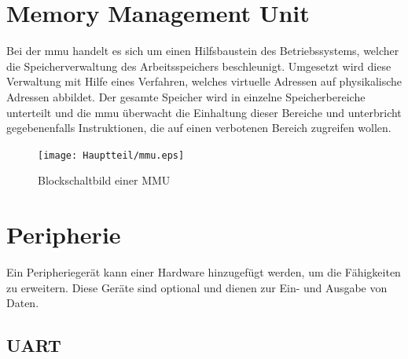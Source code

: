 \section{Memory Management Unit}\label{kap:mmu}

Bei der \ac{mmu} handelt es sich um einen Hilfsbaustein des Betriebssystems, welcher die Speicherverwaltung des Arbeitsspeichers beschleunigt. Umgesetzt wird diese Verwaltung mit
Hilfe eines Verfahren, welches virtuelle Adressen auf physikalische Adressen abbildet. Der gesamte Speicher wird in einzelne Speicherbereiche unterteilt und die
\ac{mmu} überwacht die Einhaltung dieser Bereiche und unterbricht gegebenenfalls Instruktionen, die auf einen verbotenen
Bereich zugreifen wollen.\cite{itwissen}\\

\begin{figure}[H]
\centering
\texttt{[image: Hauptteil/mmu.eps]}
\caption{Blockschaltbild einer MMU}\label{fig:mmu}
\end{figure}


 \section{Peripherie}\label{kap:peripherie}
 Ein Peripheriegerät kann einer Hardware hinzugefügt werden, um die Fähigkeiten zu erweitern. Diese Geräte sind optional und dienen zur Ein- und Ausgabe von Daten.

\subsection{UART}\label{kap:uart}

